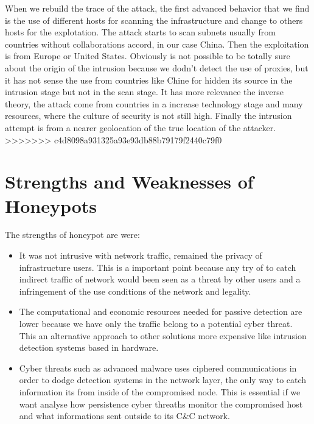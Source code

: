 \documentclass[a4paper]{llncs}
\begin{document}
When we rebuild the trace of the attack, the first advanced behavior that we find is the use of different hosts for scanning the infrastructure and change to others hosts for the explotation. The attack starts to scan subnets usually from countries without collaborations accord, in our case China. Then the exploitation is from Europe or United States. Obviously is not possible to be totally sure about the origin of the intrusion because we dodn't detect the use of proxies, but it has not sense the use from countries like Chine for hidden its source in the intrusion stage but not in the scan stage. It has more relevance the inverse theory, the attack come from countries in a increase technology stage and many resources, where the culture of security is not still high. Finally the intrusion attempt is from a nearer geolocation of the true location of the attacker.
>>>>>>> c4d8098a931325a93e93db88b79179f2440c79f0
	
	
\section{Strengths and Weaknesses of Honeypots}
\label{sec:Strengths&Weaknesse}
The strengths of honeypot are were:
\begin{itemize}
	\item It was not intrusive with network traffic, remained the privacy of infrastructure users. This is a important point because any try of to catch indirect traffic of network would been seen as a threat by other users and a infringement of the use conditions of the network and legality.
	\item The computational and economic resources needed for passive detection are lower because we have only the traffic belong to a potential cyber threat. This an alternative approach to other solutions more expensive like intrusion detection systems based in hardware.
	\item Cyber threats such as advanced malware uses ciphered communications in order to dodge detection systems in the network layer, the only way to catch information its from inside of the compromised node. This is essential if we want analyse how persistence cyber threaths monitor the compromised host and what informations sent outside to its C\&C network.
\end{itemize}
	
\end{document}
